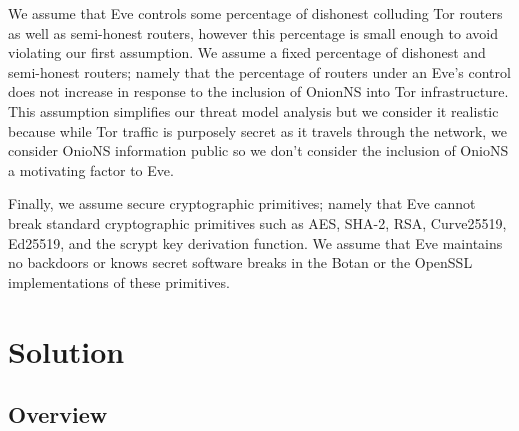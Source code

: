 \documentclass[conference]{IEEEtran}
\newcommand*\concat{\mathbin{\|}}
\begin{document}

We assume that Eve controls some percentage of dishonest colluding Tor routers as well as semi-honest routers, however this percentage is small enough to avoid violating our first assumption. We assume a fixed percentage of dishonest and semi-honest routers; namely that the percentage of routers under an Eve's control does not increase in response to the inclusion of OnionNS into Tor infrastructure. This assumption simplifies our threat model analysis but we consider it realistic because while Tor traffic is purposely secret as it travels through the network, we consider OnioNS information public so we don't consider the inclusion of OnioNS a motivating factor to Eve.

Finally, we assume secure cryptographic primitives; namely that Eve cannot break standard cryptographic primitives such as AES, SHA-2, RSA, Curve25519, Ed25519, and the scrypt key derivation function. We assume that Eve maintains no backdoors or knows secret software breaks in the Botan or the OpenSSL implementations of these primitives.

\section{Solution}
\label{sec:Solution}

\subsection{Overview}
\label{sec:SolutionOverview}
\end{document}
